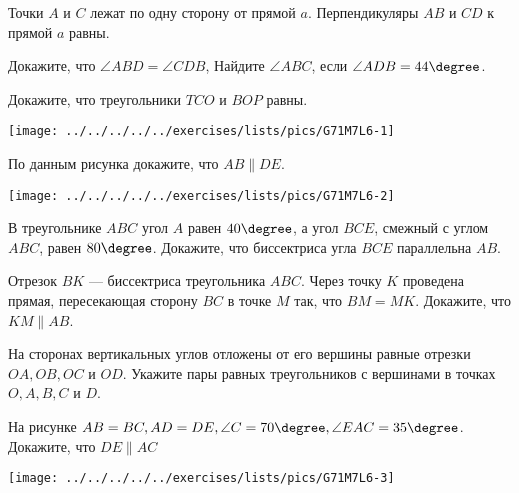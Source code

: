 \begin{class}[number=3]
	\begin{listofex}
		\item Точки \(A\) и \(C\) лежат по одну сторону от прямой \(a\). Перпендикуляры \(AB\) и \(CD\) к прямой \(a\) равны. %
		\begin{tasks}
			\task Докажите, что \( \angle ABD = \angle CDB \),
			\task Найдите  \( \angle ABC \), если \( \angle ADB =44 \degree \).
		\end{tasks}
		\item 
		\begin{minipage}[t]{\bodywidth}
			Докажите, что треугольники \(TCO\) и \( BOP \) равны.
		\end{minipage}
		\hspace{0.02\linewidth}
		\begin{minipage}[t]{\picwidth}
			\texttt{[image: ../../../../../exercises/lists/pics/G71M7L6-1]}
		\end{minipage}
		\item %
		\begin{minipage}[t]{\bodywidth}
			По данным рисунка докажите, что \(AB \parallel DE\).
		\end{minipage}
		\hspace{0.02\linewidth}
		\begin{minipage}[t]{\picwidth}
			\texttt{[image: ../../../../../exercises/lists/pics/G71M7L6-2]}
		\end{minipage}
		\item В треугольнике \(ABC\) угол \(A\) равен \(40 \degree\), а угол \(BCE\), смежный с углом \(ABC\), равен \(80 \degree\). Докажите, что биссектриса угла \(BCE\) параллельна \(AB\). %
		
		\item Отрезок \(BK\) --- биссектриса треугольника \(ABC\). Через точку \(K\) проведена прямая, пересекающая сторону \(BC\) в точке \(M\) так, что \(BM=MK\). Докажите, что \(KM \parallel AB\). 
		\item На сторонах вертикальных углов отложены от его вершины равные отрезки \(OA, OB, OC\) и \(OD\). Укажите пары равных треугольников с вершинами в точках \(O, A, B, C\) и \(D\).
		\item 
		\begin{minipage}[t]{\bodywidth}
			На рисунке \(AB=BC, AD=DE, \angle C = 70 \degree, \angle EAC = 35 \degree\). Докажите, что \(DE \parallel AC\)
		\end{minipage}
		\hspace{0.02\linewidth}
		\begin{minipage}[t]{\picwidth}
			\texttt{[image: ../../../../../exercises/lists/pics/G71M7L6-3]}
		\end{minipage}
	\end{listofex}
\end{class}

